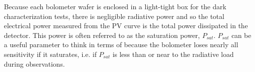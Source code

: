 %
%



Because each bolometer wafer is enclosed in a light-tight box for the dark characterization tests, there is negligible radiative power and so the total electrical power measured from the PV curve is the total power dissipated in the detector. 
This power is often referred to as the saturation power, $P_{sat}$. 
$P_{sat}$ can be a useful parameter to think in terms of because the bolometer loses nearly all sensitivity if it saturates, i.e. if $P_{sat}$ is less than or near to the radiative load during observations. 


